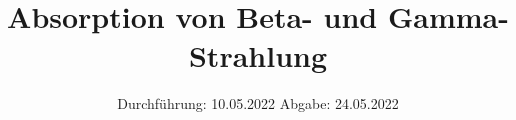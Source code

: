 

\subject{V704}
\title{Absorption von Beta- und Gamma-Strahlung}
\date{
  Durchführung: 10.05.2022
  \hspace{3em}
  Abgabe: 24.05.2022
}



\maketitle
\thispagestyle{empty}
\tableofcontents
\newpage








\newpage
\printbibliography{}
\nocite{matplotlib}
\nocite{numpy}
\nocite{scipy}
\nocite{uncertainties}
\nocite{reback2020pandas}

\newpage



